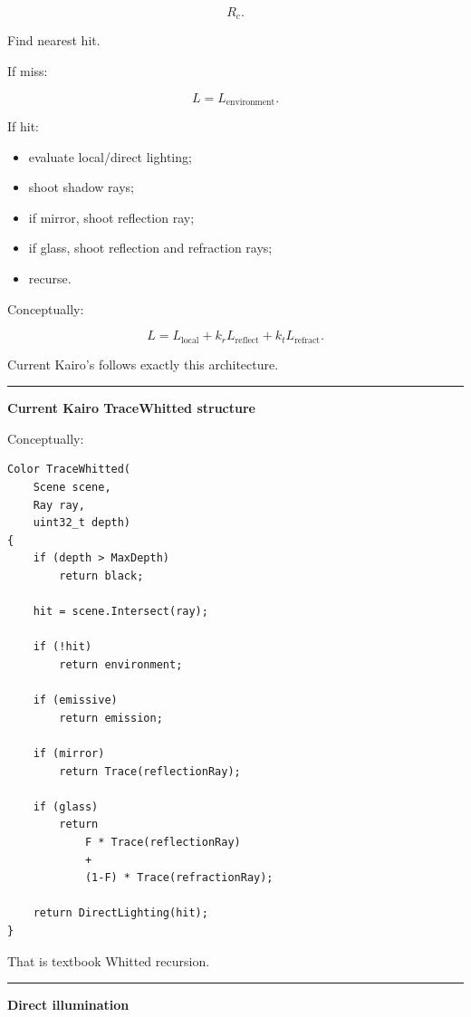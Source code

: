 \[
R_c.
\]

Find nearest hit.

If miss:

\[
L=L_{\text{environment}}.
\]

If hit:

\begin{itemize}
\tightlist
\item
  evaluate local/direct lighting;
\item
  shoot shadow rays;
\item
  if mirror, shoot reflection ray;
\item
  if glass, shoot reflection and refraction rays;
\item
  recurse.
\end{itemize}

Conceptually:

\[
\boxed{
L=
L_{\text{local}}
+
k_rL_{\text{reflect}}
+
k_tL_{\text{refract}}.
}
\]

Current Kairo's  follows exactly this architecture.

\begin{center}\rule{0.5\linewidth}{0.5pt}\end{center}

\textbf{Current Kairo TraceWhitted structure}

Conceptually:

\begin{verbatim}
Color TraceWhitted(
    Scene scene,
    Ray ray,
    uint32_t depth)
{
    if (depth > MaxDepth)
        return black;

    hit = scene.Intersect(ray);

    if (!hit)
        return environment;

    if (emissive)
        return emission;

    if (mirror)
        return Trace(reflectionRay);

    if (glass)
        return
            F * Trace(reflectionRay)
            +
            (1-F) * Trace(refractionRay);

    return DirectLighting(hit);
}
\end{verbatim}

That is textbook Whitted recursion.

\begin{center}\rule{0.5\linewidth}{0.5pt}\end{center}

\textbf{Direct illumination}

